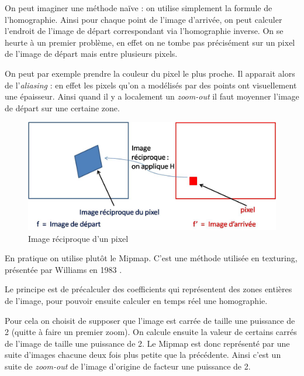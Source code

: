 



On peut imaginer une méthode naïve : on utilise simplement la formule de l'homographie. Ainsi pour chaque point de l'image d'arrivée, on peut calculer l'endroit de l'image de départ correspondant via l'homographie inverse. On se heurte à un premier problème, en effet on ne tombe pas précisément sur un pixel de l'image de départ mais entre plusieurs pixels. 

On peut par exemple prendre la couleur du pixel le plus proche. Il apparait alors de l'\emph{aliasing} : en effet les pixels qu'on a modélisés par des points ont visuellement une épaisseur. Ainsi quand il y a localement un \emph{zoom-out} il faut moyenner l'image de départ sur une certaine zone.


\begin{figure}[h!]
\centering
\includegraphics[scale=0.5]{imagereciproque.jpg}
\caption{Image réciproque d'un pixel}
\end{figure}

En pratique on utilise plutôt le Mipmap. C'est une méthode utilisée en texturing, présentée par Williams en 1983 \cite{williams1983pyramidal}.


Le principe est de précalculer des coefficients qui représentent des zones entières de l'image, pour pouvoir ensuite calculer en temps réel une homographie. 

Pour cela on choisit de supposer que l'image est carrée de taille une puissance de 2 (quitte à faire un premier zoom). On calcule ensuite la valeur de certains carrés de l'image de taille une puissance de 2.
Le Mipmap est donc représenté par une suite d'images chacune deux fois plus petite que la précédente. Ainsi c'est un suite de \emph{zoom-out} de l'image d'origine de facteur une puissance de 2.

